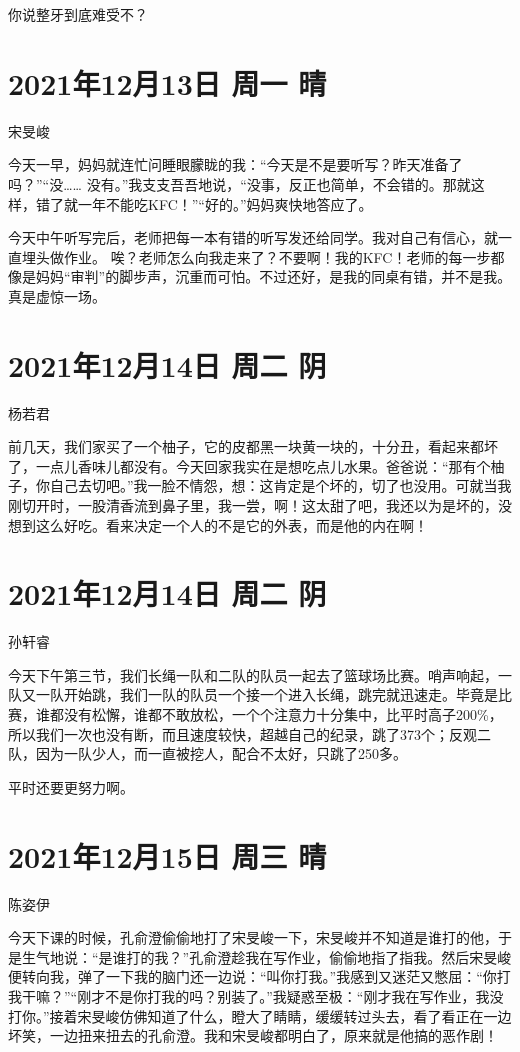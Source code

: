 你说整牙到底难受不？

\section{2021年12月13日 周一 晴}

宋旻峻

今天一早，妈妈就连忙问睡眼朦眬的我：“今天是不是要听写？昨天准备了吗？”“没…… 没有。”我支支吾吾地说，“没事，反正也简单，不会错的。那就这样，错了就一年不能吃KFC！”“好的。”妈妈爽快地答应了。

今天中午听写完后，老师把每一本有错的听写发还给同学。我对自己有信心，就一直埋头做作业。
唉？老师怎么向我走来了？不要啊！我的KFC！老师的每一步都像是妈妈“审判”的脚步声，沉重而可怕。不过还好，是我的同桌有错，并不是我。真是虚惊一场。

\section{2021年12月14日 周二 阴}

杨若君

前几天，我们家买了一个柚子，它的皮都黑一块黄一块的，十分丑，看起来都坏了，一点儿香味儿都没有。今天回家我实在是想吃点儿水果。爸爸说：“那有个柚子，你自己去切吧。”我一脸不情怨，想：这肯定是个坏的，切了也没用。可就当我刚切开时，一股清香流到鼻子里，我一尝，啊！这太甜了吧，我还以为是坏的，没想到这么好吃。看来决定一个人的不是它的外表，而是他的内在啊！

\section{2021年12月14日 周二 阴}

孙轩睿

今天下午第三节，我们长绳一队和二队的队员一起去了篮球场比赛。哨声响起，一队又一队开始跳，我们一队的队员一个接一个进入长绳，跳完就迅速走。毕竟是比赛，谁都没有松懈，谁都不敢放松，一个个注意力十分集中，比平时高子200\%，所以我们一次也没有断，而且速度较快，超越自己的纪录，跳了373个；反观二队，因为一队少人，而一直被挖人，配合不太好，只跳了250多。

平时还要更努力啊。

\section{2021年12月15日 周三 晴}

陈姿伊

今天下课的时候，孔俞澄偷偷地打了宋旻峻一下，宋旻峻并不知道是谁打的他，于是生气地说：“是谁打的我？”孔俞澄趁我在写作业，偷偷地指了指我。然后宋旻峻便转向我，弹了一下我的脑门还一边说：“叫你打我。”我感到又迷茫又憋屈：“你打我干嘛？”“刚才不是你打我的吗？别装了。”我疑惑至极：“刚才我在写作业，我没打你。”接着宋旻峻仿佛知道了什么，瞪大了睛睛，缓缓转过头去，看了看正在一边坏笑，一边扭来扭去的孔俞澄。我和宋旻峻都明白了，原来就是他搞的恶作剧！


